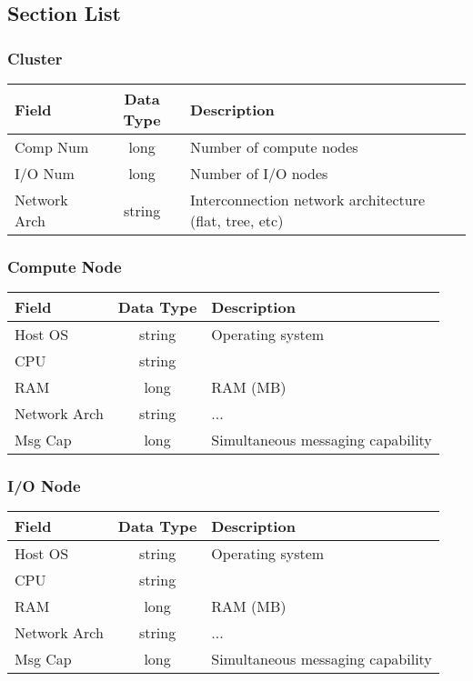 \documentclass{article}
\begin{document}
\subsection{Section List}
\label{sec:ArchSectionList}

\subsubsection{Cluster}
\label{sec:Cluster}
\begin{flushleft}
  \begin{tabular}{l | c | l}
    Field & Data Type & Description\\\hline
    Comp Num & long & Number of compute nodes\\
    I/O Num & long & Number of I/O nodes\\
    Network Arch & string & Interconnection network architecture (flat, tree, etc)\\
  \end{tabular}
\end{flushleft}

\subsubsection{Compute Node}
\label{sec:ComputeNode}
\begin{flushleft}
  \begin{tabular}{l | c | l}
    Field & Data Type & Description\\\hline
    Host OS & string & Operating system\\
    CPU & string & \\
    RAM & long & RAM (MB)\\
    Network Arch & string & ...\\
    Msg Cap & long & Simultaneous messaging capability\\		
  \end{tabular}
\end{flushleft}

\subsubsection{I/O Node}
\label{sec:IONode}
\begin{flushleft}
  \begin{tabular}{l | c | l}
    Field & Data Type & Description\\\hline
    Host OS & string & Operating system\\
    CPU & string & \\
    RAM & long & RAM (MB) \\
    Network Arch & string & ...\\
    Msg Cap & long & Simultaneous messaging capability\\
  \end{tabular}
\end{flushleft}
\end{document}

